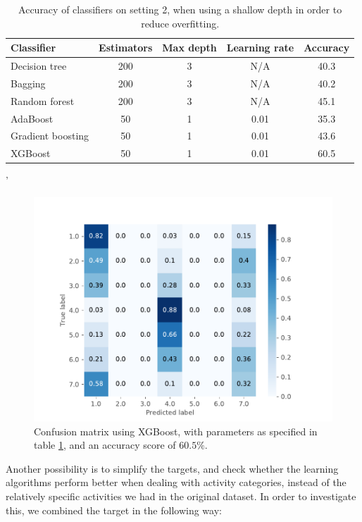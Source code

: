 \begin{table}[]
\caption{Accuracy of classifiers on setting 2, when using a shallow depth in order to reduce overfitting.}
\begin{tabular}{|l|c|c|c|c|}
\hline
Classifier & Estimators & Max depth & Learning rate & Accuracy \\
\hline
Decision tree      & 200  & 3 & N/A  & 40.3   \\ \hline
Bagging            & 200  & 3 & N/A  & 40.2  \\ \hline
Random forest      & 200  & 3 & N/A  & 45.1  \\ \hline
AdaBoost           & 50  & 1 & 0.01  & 35.3  \\ \hline
Gradient boosting  & 50  & 1 & 0.01  & 43.6  \\ \hline
XGBoost            & 50  & 1 & 0.01  & 60.5  \\ \hline
\end{tabular}'
\label{tab:accuracy2}
\end{table}

\begin{figure}
    \centering
    \includegraphics[scale=0.8]{Figures/20191206-125914-confusionmatrix.pdf}
    \caption{Confusion matrix using XGBoost, with parameters as specified in table \ref{tab:accuracy2}, and an accuracy score of $60.5\%$.}
    \label{fig:xgboost_confusion_matrix}
\end{figure}

Another possibility is to simplify the targets, and check whether the learning algorithms perform better when dealing with activity categories, instead of the relatively specific activities we had in the original dataset. In order to investigate this, we combined the target in the following way:

